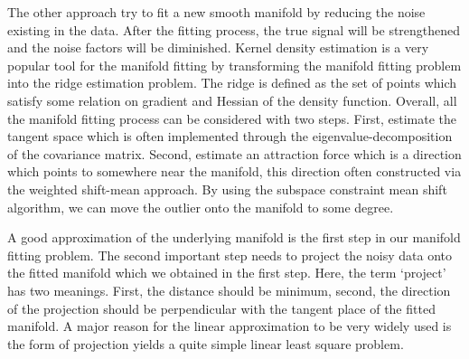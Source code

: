 \documentclass{article}
\theoremstyle{remark}
\begin{document}
 The other approach try to fit a new smooth manifold by reducing the noise existing in the data. After the fitting process, the true signal will be strengthened and the noise factors will be diminished. Kernel density estimation \cite{genovese2014nonparametric,ozertem2011locally} is a very popular tool for the manifold fitting by transforming the manifold fitting problem into the ridge estimation problem. The ridge is defined as the set of points which satisfy some relation on gradient and Hessian of the density function. Overall, all the manifold fitting process can be considered with two steps. First, estimate the tangent space which is often implemented through the eigenvalue-decomposition of the covariance matrix. Second,  estimate an attraction force which is a  direction which points to somewhere near the manifold, this direction often constructed via the weighted shift-mean approach. By using the subspace constraint mean shift algorithm, we can move the outlier onto the manifold to some degree.
 

A good approximation of the underlying manifold is the first step in our manifold fitting problem. The second important step needs to project the noisy data onto the fitted manifold which we obtained in the first step. Here, the term `project' has two meanings. First, the distance should be minimum, second, the direction of the projection should be perpendicular with the tangent place of the fitted manifold. A major reason for the linear approximation to be very widely used is the form of projection yields a quite simple linear least square problem.


\end{document}
